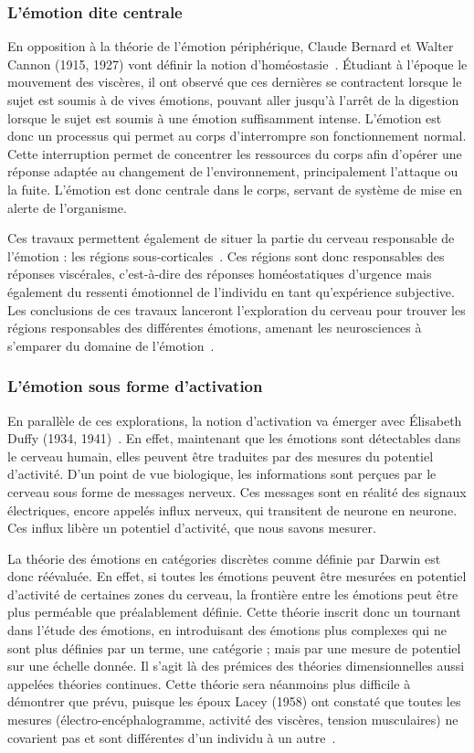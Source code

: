 \subsubsection{L'émotion dite centrale}
En opposition à la théorie de l'émotion périphérique, Claude Bernard et Walter Cannon (1915, 1927) vont définir la notion d’homéostasie~\cite{Cannon1915,Cannon1927}. Étudiant à l'époque le mouvement des viscères, il ont observé que ces dernières se contractent lorsque le sujet est soumis à de vives émotions, pouvant aller jusqu'à l'arrêt de la digestion lorsque le sujet est soumis à une émotion suffisamment intense. L'émotion est donc un processus qui permet au corps d'interrompre son fonctionnement normal. Cette interruption permet de concentrer les ressources du corps afin d'opérer une réponse adaptée au changement de l'environnement, principalement l'attaque ou la fuite. L'émotion est donc centrale dans le corps, servant de système de mise en alerte de l'organisme.

Ces travaux permettent également de situer la partie du cerveau responsable de l'émotion : les régions sous-corticales~\cite{Cannon1933}. Ces régions sont donc responsables des réponses viscérales, c'est-à-dire des réponses homéostatiques d'urgence mais également du ressenti émotionnel de l'individu en tant qu'expérience subjective.
Les conclusions de ces travaux lanceront l'exploration du cerveau pour trouver les régions responsables des différentes émotions, amenant les neurosciences à s'emparer du domaine de l'émotion~\cite{Bard1934}.

\subsubsection{L'émotion sous forme d'activation}
En parallèle de ces explorations, la notion d'activation va émerger avec Élisabeth Duffy (1934, 1941)~\cite{Duffy1934,Duffy1941}. En effet, maintenant que les émotions sont détectables dans le cerveau humain, elles peuvent être traduites par des mesures du potentiel d'activité. D'un point de vue biologique, les informations sont perçues par le cerveau sous forme de messages nerveux. Ces messages sont en réalité des signaux électriques, encore appelés influx nerveux, qui transitent de neurone en neurone. Ces influx libère un potentiel d'activité, que nous savons mesurer.

La théorie des émotions en catégories discrètes comme définie par Darwin est donc réévaluée. En effet, si toutes les émotions peuvent être mesurées en potentiel d'activité de certaines zones du cerveau, la frontière entre les émotions peut être plus perméable que préalablement définie. Cette théorie inscrit donc un tournant dans l'étude des émotions, en introduisant des émotions plus complexes qui ne sont plus définies par un terme, une catégorie ; mais par une mesure de potentiel sur une échelle donnée. Il s'agit là des prémices des théories dimensionnelles aussi appelées théories continues.
Cette théorie sera néanmoins plus difficile à démontrer que prévu, puisque les époux Lacey (1958) ont constaté que toutes les mesures (électro-encéphalogramme, activité des viscères, tension musculaires) ne covarient pas et sont différentes d'un individu à un autre~\cite{Lacey1958}.

